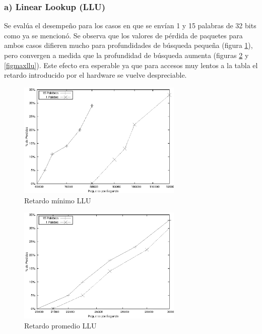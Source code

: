 \subsubsection{a) Linear Lookup (LLU)}
Se evalúa el desempeño para los casos en que se envían 1 y 15 palabras de 32 bits como ya se mencionó. Se observa que los valores de pérdida de paquetes para ambos casos difieren mucho para profundidades de búsqueda pequeña (figura \ref{figminllu}), pero convergen a medida que la profundidad de búsqueda aumenta (figuras \ref{figpromllu} y \ref{figmaxllu}). Este efecto era esperable ya que para accesos muy lentos a la tabla el retardo introducido por el hardware se vuelve despreciable.



\newpage
\begin{figure}[!h]
  \centering
	\includegraphics[width=0.7\textwidth]{5-resultados/graf/llumin.eps}
  \caption{Retardo mínimo LLU}
  \label{figminllu}
\end{figure}
\begin{figure}[!h]
  \centering
	\includegraphics[width=0.7\textwidth]{5-resultados/graf/lluprom.eps}
  \caption{Retardo promedio LLU}
  \label{figpromllu}
\newpage
\end{figure}
